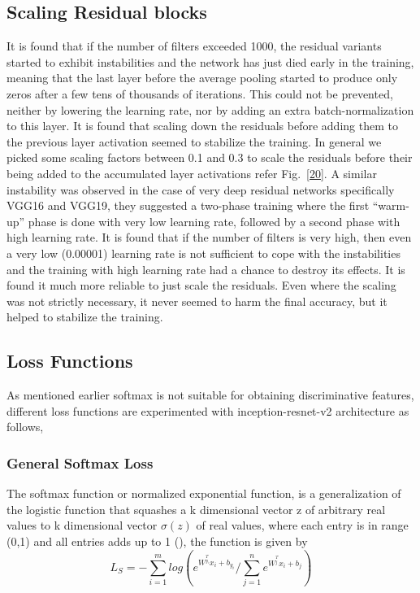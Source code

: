 \documentclass[a4paper,12pt, twoside]{NITKReport}
\begin{document}
\subsection{Scaling Residual blocks}
\par It is found that if the number of filters exceeded 1000, the residual variants started to exhibit instabilities and the network has just died early in the training, meaning that the last layer before the average pooling started to produce only zeros after a few tens of thousands of iterations. This could not be prevented, neither by lowering the learning rate, nor by adding an extra batch-normalization to this layer. It is found that scaling down the residuals before adding them to the previous layer activation seemed to stabilize the
training. In general we picked some scaling factors between 0.1 and 0.3 to scale the residuals before their being added to the accumulated layer activations refer Fig.~\ref{20}. A similar instability was observed in the case of very deep residual networks specifically VGG16 and VGG19, they suggested a two-phase training where the first “warm-up” phase is done with  very  low  learning  rate,  followed  by  a  second  phase with  high  learning  rate. It is found that if the number of filters is very high, then even a very low (0.00001) learning rate is not sufficient to cope with the instabilities and the training with high learning rate had a chance to destroy its effects. It is found it much more reliable to just scale the
residuals. Even  where  the  scaling  was  not  strictly  necessary,  it
never seemed to harm the final accuracy,  but it helped to stabilize the training.

\subsection{Loss Functions}
\par As mentioned earlier softmax is not suitable for obtaining discriminative features, different loss functions are experimented with inception-resnet-v2 architecture as follows,

\subsubsection{General Softmax Loss}
\par  The softmax function or normalized exponential function, is a generalization of the logistic function that squashes a k dimensional vector z of arbitrary real values to k dimensional vector $\sigma (z)$ of real values, where each entry is in range (0,1) and all entries adds up to 1 (\cite{100}), the function is given by
\begin{equation}
L_{S} = -\sum_{i=1}^{m}log (e^{W^{_{y_{i}}^{T}}x_{i}+b_{y_{i}}} / \sum_{j=1}^{n} e^{W^{_{j}^{T}}x_{i}+b_{j}})
\end{equation}
\end{document}
